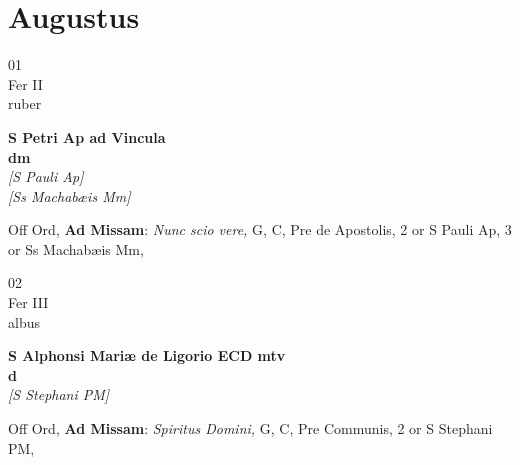 \documentclass[10pt, openany]{book}
\begin{document}
        \chapter{Augustus}
                        
        \begin{center}
            \begin{minipage}{3.5in}
                \vspace{2em}
                \begin{minipage}{0.5in}
                    {\Huge 01} \\
                    {\normalsize Fer II} \\
                    {\normalsize ruber}
                \end{minipage}
                \begin{minipage}{3.0in}
                    \textbf{ \large S Petri Ap ad Vincula \\
                    \textnormal{\normalsize dm}} \\ \textit{[S Pauli Ap]} \\ \textit{[Ss Machabæis Mm]} \\ 
                \end{minipage}
                \begin{justify}Off Ord, \textbf{Ad Missam}: \textit{Nunc scio vere,} G, C, Pre de Apostolis, 2 or S Pauli Ap, 3 or Ss Machabæis Mm,   
                \end{justify}
            \end{minipage}
        \end{center}
    
        \begin{center}
            \begin{minipage}{3.5in}
                \vspace{2em}
                \begin{minipage}{0.5in}
                    {\Huge 02} \\
                    {\normalsize Fer III} \\
                    {\normalsize albus}
                \end{minipage}
                \begin{minipage}{3.0in}
                    \textbf{ \large S Alphonsi Mariæ de Ligorio ECD mtv \\
                    \textnormal{\normalsize d}} \\ \textit{[S Stephani PM]} \\ 
                \end{minipage}
                \begin{justify}Off Ord, \textbf{Ad Missam}: \textit{Spiritus Domini,} G, C, Pre Communis, 2 or S Stephani PM,   
                \end{justify}
            \end{minipage}
        \end{center}
    
\end{document}
